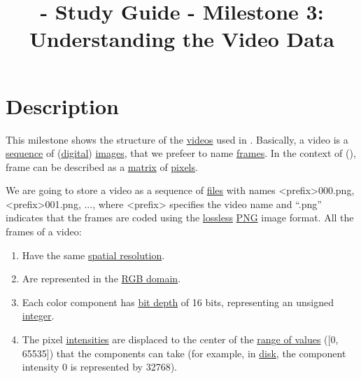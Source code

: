 
\title{\SM{} - Study Guide - Milestone 3: Understanding the Video Data}

\maketitle

\section{Description}

This milestone shows the structure of the
\href{https://en.wikipedia.org/wiki/Video}{videos} used in
\theproject{}. Basically, a video is a
\href{https://en.wikipedia.org/wiki/Sequence}{sequence} of
(\href{https://en.wikipedia.org/wiki/Digital_data}{digital})
\href{https://en.wikipedia.org/wiki/Image}{images}, that we prefeer to
name \href{https://en.wikipedia.org/wiki/Film_frame}{frames}. In the
context of \theproject(), frame can be described as a
\href{https://en.wikipedia.org/wiki/Matrix_(mathematics)}{matrix} of
\href{https://en.wikipedia.org/wiki/Pixel}{pixels}.

We are going to store a video as a sequence of
\href{https://en.wikipedia.org/wiki/Computer_file}{files} with names
<prefix>000.png, <prefix>001.png, ..., where <prefix> specifies the
video name and ``.png'' indicates that the frames are coded using the
\href{https://en.wikipedia.org/wiki/Lossless_compression}{lossless}
\href{https://en.wikipedia.org/wiki/Portable_Network_Graphics}{PNG}
image format. All the frames of a video:
\begin{enumerate}
\item Have the same
  \href{https://en.wikipedia.org/wiki/Image_resolution}{spatial
    resolution}.
\item Are represented in the
  \href{https://en.wikipedia.org/wiki/RGB_color_model}{RGB domain}.
\item Each color component has
  \href{https://en.wikipedia.org/wiki/Glossary_of_computer_graphics#bit_depth}{bit
    depth} of 16 bits, representing an unsigned
  \href{https://en.wikipedia.org/wiki/Integer_(computer_science)}{integer}.
\item The pixel
  \href{https://en.wikipedia.org/wiki/Luminous_intensity}{intensities}
  are displaced to the center of the
  \href{https://en.wikipedia.org/wiki/Range_(computer_programming)}{range
    of values} ([0, 65535]) that the components can take (for example,
  in \href{https://en.wikipedia.org/wiki/Disk_storage}{disk}, the
  component intensity 0 is represented by 32768).
\end{enumerate}
  
